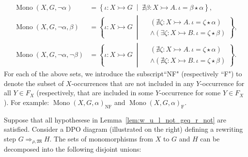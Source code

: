 \begin{notation}
\begin{align*}
        \\
        \operatorname{Mono}(X,G,\lnot \alpha) &= \left\{ \iota \mathop{\colon} X \rightarrowtail G \;\middle|\; \nexists \beta \mathop{\colon} X \rightarrowtail A.\, \iota \mathop{=} \beta \mathop{\star} \alpha \right\}, 
        \\
        \operatorname{Mono}(X,G,\lnot \alpha, \beta) &= \left\{ 
            \iota \mathop{\colon} X \rightarrowtail G \;\middle|\; 
                \begin{aligned}  
                    &(\nexists \zeta \mathop{\colon} X \rightarrowtail A.\, \iota \mathop{=} \zeta \mathop{\star} \alpha) \\ 
                    &\land (\exists \zeta \mathop{\colon} X \rightarrowtail B.\, \iota \mathop{=} \zeta \mathop{\star} \beta)
                \end{aligned}
        \right\},
        \\
        \operatorname{Mono}(X,G,\lnot \alpha, \lnot \beta) &= \left\{ 
            \iota \mathop{\colon} X \rightarrowtail G \;\middle|\; 
                \begin{aligned}
                    &(\nexists \zeta \mathop{\colon} X \rightarrowtail A.\, \iota \mathop{=} \zeta \mathop{\star} \alpha) \\
                    &\land (\nexists \zeta \mathop{\colon} X \rightarrowtail B.\, \iota \mathop{=} \zeta \mathop{\star} \beta)
                \end{aligned}
        \right\}.
    \end{align*}
    For each of the above sets, we introduce the subscript``NF" (respectively ``F") to denote the subset of \( X \)-occurrences that are not included in any \( Y \)-occurrence for all \( Y \mathop{\in} F_X \) (respectively, that are included in some \( Y \)-occurrence for some \( Y \mathop{\in} F_X \)). For example: \( \operatorname{Mono}(X, G, \alpha)_{\text{NF}} \) and \( \operatorname{Mono}(X, G, \alpha)_{\text{F}} \).
\end{notation}
\noindent
\begin{minipage}{0.7\textwidth}\setlength{\parindent}{1em}
    Suppose that all hypothesese in Lemma~\ref{lem:w_u_l_not_geq_r_not} are satisfied. Consider a DPO diagram (illustrated on the right) defining a rewriting step \( G \mathop{\Rightarrow}_{\rho,\mathfrak{M}} H \). 
    The sets of monomorphisms from \( X \) to \( G \) and \( H \) can be decomposed into the following disjoint unions:
\end{minipage}%

